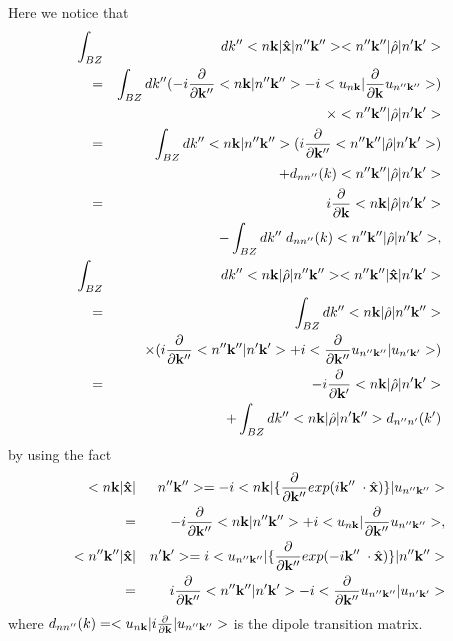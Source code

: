 \documentclass[aps,prb,preprint]{revtex4-1}
\begin{document}
Here we notice that
\begin{eqnarray}
\int_{BZ} &&dk'' <n{\bf k}| {\bf \hat{x}} |n''{\bf k''}><n''{\bf k''}| \hat{\rho} |n'{\bf k'}> \nonumber \\
=&&  \int_{BZ} dk'' (- i \frac{\partial}{\partial {\bf k''}} <n{\bf k}|n''{\bf k''}> - i <u_{n{\bf k}}|  \frac{\partial}{\partial {\bf k}} u_{n''{\bf k''}}>) \nonumber \\
&&\times <n''{\bf k''}| \hat{\rho} |n'{\bf k'}> \nonumber \\
=&&  \int_{BZ} dk''  <n{\bf k}|n''{\bf k''}>( i\frac{\partial}{\partial {\bf k''}} <n''{\bf k''}| \hat{\rho} |n'{\bf k'}>) \nonumber \\
&& + d_{nn''}(k)<n''{\bf k''}| \hat{\rho} |n'{\bf k'}> \nonumber \\
=&& i \frac{\partial}{\partial {\bf k}} <n{\bf k}| \hat{\rho} |n'{\bf k'}> \nonumber \\
&& - \int_{BZ} dk'' \; d_{nn''}(k)<n''{\bf k''}| \hat{\rho} |n'{\bf k'}>, \label{eq:F1} \\
%
\int_{BZ} &&dk'' <n{\bf k}| \hat{\rho} |n''{\bf k''}><n''{\bf k''}| {\bf \hat{x}} |n'{\bf k'}> \nonumber \\
=&&  \int_{BZ} dk'' <n{\bf k}| \hat{\rho} |n''{\bf k''}> \nonumber \\
&&\times (i \frac{\partial}{\partial {\bf k''}} <n''{\bf k''}|n'{\bf k'}> + i <\frac{\partial}{\partial {\bf k''}} u_{n''{\bf k''}} |u_{n'{\bf k'}}>) \nonumber \\
=&& - i \frac{\partial}{\partial {\bf k'}} <n{\bf k}| \hat{\rho} |n'{\bf k'}> \nonumber\\
&& + \int_{BZ} dk''  <n{\bf k}| \hat{\rho} |n'{\bf k''}> d_{n''n'}(k') \label{eq:F2}
\end{eqnarray}
by using the fact\cite{Blount} 
\begin{eqnarray*}
<n{\bf k}| {\bf \hat{x}} |&&n''{\bf k''}> = - i <n{\bf k}| \{ \frac{\partial}{\partial {\bf k''}} exp(i{\bf k''} \;  \cdot \hat{\bf x}) \} |u_{n''{\bf k''}}> \\
=&&  - i \frac{\partial}{\partial {\bf k''}} <n{\bf k}|n''{\bf k''}> + i <u_{n{\bf k}}| \frac{\partial}{\partial {\bf k''}} u_{n''{\bf k''}}>, \\
<n''{\bf k''}| {\bf \hat{x}} |&&n'{\bf k'}> =  i <u_{n''{\bf k''}}| \{ \frac{\partial}{\partial {\bf k''}} exp(- i{\bf k''} \;  \cdot \hat{\bf x}) \} |n''{\bf k''}> \\
=&&  i \frac{\partial}{\partial {\bf k''}} <n''{\bf k''}|n'{\bf k'}> - i <\frac{\partial}{\partial {\bf k''}} u_{n''{\bf k''}} |u_{n'{\bf k'}}>
\end{eqnarray*}
where $d_{nn''}(k)=<u_{n{\bf k}}| i \frac{\partial}{\partial {\bf k}} |u_{n''{\bf k''}}>$ is the dipole transition matrix.
\end{document}

